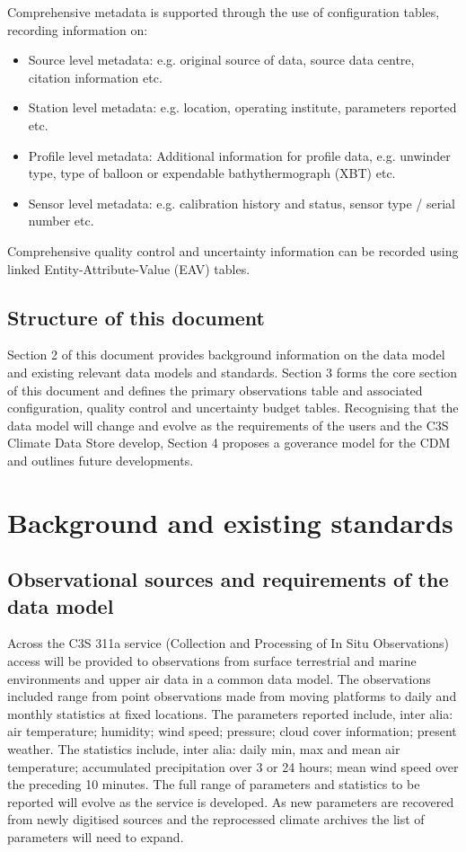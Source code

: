 \documentclass[a4paper,11pt]{article}
\begin{document}
Comprehensive metadata is supported through the use of configuration tables, recording information on:
\begin{itemize}
\item Source level metadata: e.g. original source of data, source data centre, citation information etc.
\item Station level metadata: e.g. location, operating institute, parameters reported etc.
\item Profile level metadata: Additional information for profile data, e.g. unwinder type, type of balloon or expendable bathythermograph (XBT) etc.
\item Sensor level metadata: e.g. calibration history and status, sensor type / serial number etc.
\end{itemize}
Comprehensive quality control and uncertainty information can be recorded using linked Entity-Attribute-Value (EAV) tables.

\subsection {Structure of this document}

Section 2 of this document provides background information on the data model and existing relevant data models and standards. Section 3 forms the core section of this document and defines the primary observations table and associated configuration, quality control and uncertainty budget tables. Recognising that the data model will change and evolve as the requirements of the users and the C3S Climate Data Store develop, Section 4 proposes a goverance model for the CDM and outlines future developments.

\section {Background and existing standards}
\subsection {Observational sources and requirements of the data model}

Across the C3S 311a service (Collection and Processing of In Situ Observations) access will be provided to observations from surface terrestrial and marine environments and upper air data in a common data model. The observations included range from point observations made from moving platforms to daily and monthly statistics at fixed locations. The parameters reported include, inter alia: air temperature; humidity; wind speed; pressure; cloud cover information; present weather. The statistics include, inter alia: daily min, max and mean air temperature; accumulated precipitation over 3 or 24 hours; mean wind speed over the preceding 10 minutes. The full range of parameters and statistics to be reported will evolve as the service is developed. As new parameters are recovered from newly digitised sources and the reprocessed climate archives the list of parameters will need to expand.\\
\end{document}
